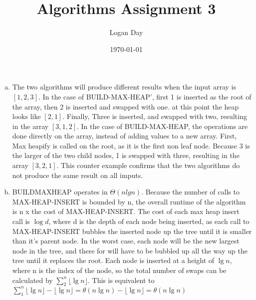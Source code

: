 \documentclass{article}
\title{Algorithms Assignment 3}
\author{Logan Day}
\date{\today}
\begin{document}
\maketitle
\section{}

\begin{enumerate}[a.]

    \item

        The two algorithms will produce different results when the input array
        is $[1, 2, 3]$. In the case of BUILD-MAX-HEAP', first 1 is inserted
        as the root of the array, then 2 is inserted and swapped with one. at
        this point the heap looks like $[2, 1]$. Finally, Three is inserted,
        and swapped with two, resulting in the array $[3, 1, 2]$. In the case
        of BUILD-MAX-HEAP, the operations are done directly on the array, instead
        of adding values to a new array. First, Max heapify is called on the
        root, as it is the first non leaf node. Because 3 is the larger of the
        two child nodes, 1 is swapped with three, resulting in the array $[3,
        2, 1]$. This counter example confirms that the two algorithms do not
        produce the same result on all imputs. 

    \item

        BUILDMAXHEAP operates in $\Theta(nlg{n})$. Because the number of calls
        to MAX-HEAP-INSERT is bounded by n, the overall runtime of the
        algorithm is n x the cost of MAX-HEAP-INSERT. The cost of each max heap
        insert call is $\log{d}$, where d is the depth of each node being
        inserted, as each call to MAX-HEAP-INSERT bubbles the inserted node up
        the tree until it is smaller than it's parent node. In the worst case,
        each node will be the new largest node in the tree, and there for will
        have to be bubbled up all the way up the tree until it replaces the
        root. Each node is inserted at a height of $\lg{n}$, where n is the
        index of the node, so the total number of swaps can be calculated by
        $\sum_2^n{ \lfloor \lg{n} \rfloor }$. This is equivalent to  $\sum_1^n{
            \lfloor \lg{n} \rfloor } -  \lfloor \lg{n} \rfloor =
        \theta(n\lg{n}) - \lfloor \lg{n} \rfloor = \theta(n\lg{n})$

\end{enumerate}
\end{document}
